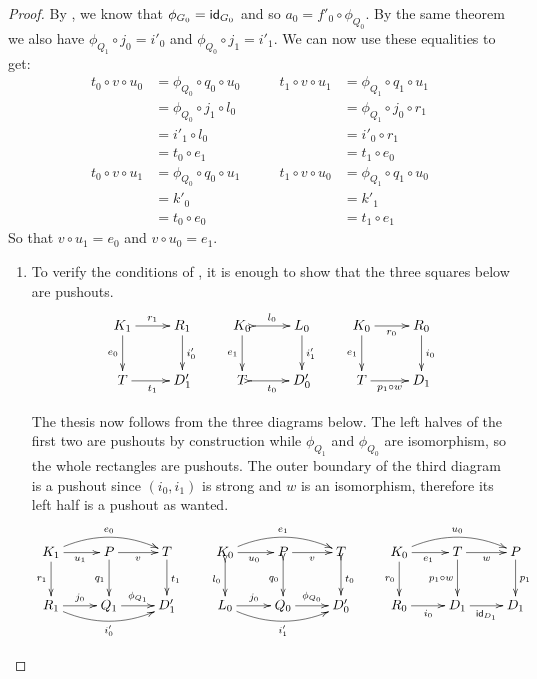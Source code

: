 \begin{proof}
	By , we know that $\phi_{G_0}=\mathsf{id}_{G_0}$ and so $a_0=f'_0\circ \phi_{Q_0}$. By the same theorem we also have 
	$\phi_{Q_1}\circ j_0=i'_0$ and $\phi_{Q_0}\circ j_1=i'_1$. We can now use these equalities to get:
	\[\begin{split}
		t_0\circ v\circ u_0&=\phi_{Q_0} \circ q_0\circ u_0\\&=\phi_{Q_0}\circ j_1\circ l_0\\&=i'_1\circ l_0\\&=t_0\circ e_1
	\end{split} \qquad \begin{split}
		t_1\circ v\circ u_1&=\phi_{Q_1} \circ q_1\circ u_1\\&=\phi_{Q_1}\circ j_0\circ r_1\\&=i'_0\circ r_1\\&= t_1\circ e_0 
	\end{split}\]
	\[\begin{split}t_0\circ v\circ u_1&=\phi_{Q_0} \circ q_0\circ u_1\\&=k'_0\\&= t_0\circ e_0
	\end{split}\qquad \begin{split}
	t_1\circ v\circ u_0&=\phi_{Q_1} \circ q_1\circ u_0\\&=k'_1\\&=t_1\circ e_1
	\end{split}\]
	So that $v\circ u_1=e_0$ and $v\circ u_0=e_1$.
	
	\begin{enumerate}
	\item To verify the conditions of , it is enough to show that the three squares below are pushouts.
	\[\xymatrix{K_1  \ar[d]_{e_0} \ar[r]^{r_1} & R_1 \ar[d]^{i'_0} & K_0 \ar@{>->}[r]^{l_0} \ar[d]_{e_1}& L_0 \ar[d]^{i'_1}& K_0  \ar[r]_{r_0} \ar[d]_{e_1}& R_0  \ar[d]^{i_0}\\ T \ar[r]_{t_1}  & D'_1 & T \ar@{>->}[r]_{t_0} & D'_0 &T \ar[r]_-{p_1\circ w}& D_1}\]
	
	 The thesis now follows from the three diagrams below. The left halves of the first two are pushouts by construction while $\phi_{Q_1}$ and $\phi_{Q_0}$ are isomorphism, so the whole rectangles are pushouts. The outer boundary of the third diagram is a pushout since $(i_0, i_1)$ is strong and $w$ is an isomorphism, therefore its left half is a pushout as wanted.
	\[\xymatrix{K_1  \ar@/^.4cm/[rr]^{e_0}\ar[r]_{u_1} \ar[d]_{r_1}& P \ar[r]_{v} \ar[d]_{q_1} & T \ar[d]^{t_1} & K_0 \ar@/^.4cm/[rr]^{e_1} \ar@{>->}[d]_{l_0}\ar[r]_{u_0} & P \ar[r]_{v}  \ar@{>->}[d]_{q_0}& T \ar@{>->}[d]^{t_0}& K_0 \ar@/^.4cm/[rr]^{u_0} \ar[d]_{r_0} \ar[r]_{e_1}& T  \ar[d]_{p_1\circ w}\ar[r]_{w} & P \ar[d]^{p_1}\\ R_1 \ar@/_.4cm/[rr]_{i'_0} \ar[r]^{j_0}& Q_1 \ar[r]^{\phi_{Q_1}} & D'_1 & L_0 \ar@/_.4cm/[rr]_{i'_1} \ar[r]^{j_0} & Q_0 \ar[r]^{\phi_{Q_0}} & D'_0 &R_0 \ar[r]_{i_0}& D_1 \ar[r]_{\id{D_1}}& D_1}\]
	

\end{enumerate}
\end{proof}

